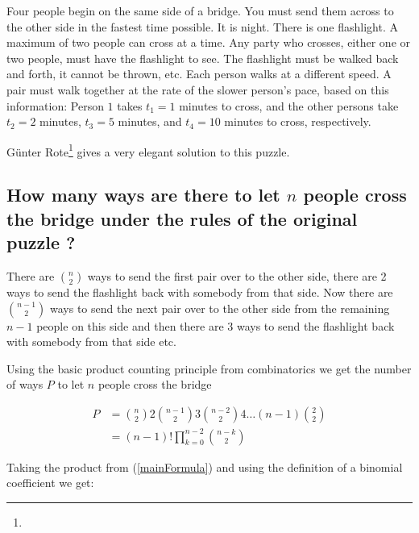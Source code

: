 \begin{fullwidth}

\vspace{10 mm}
\begin{problem}
Four people begin on the same side of a bridge. You must send them across to the other side in the fastest time possible. It is night. There is one flashlight. A maximum of two people can cross at a time. Any party who crosses, either one or two people, must have the flashlight to see. The flashlight must be walked back and forth, it cannot be thrown, etc. Each person walks at a different speed. A pair must walk together at the rate of the slower person's pace, based on this information: Person $1$ takes $t_1 = 1$ minutes to cross, and the other persons take $t_2 = 2$ minutes, $t_3 = 5$ minutes, and $t_4 = 10$ minutes to cross, respectively. 
\end{problem}

\end{fullwidth}

G\"unter Rote\footnote{} gives a very elegant solution to this puzzle.

\subsection{How many ways are there to let $n$ people cross the bridge under the rules of the original puzzle ?}

There are $\binom{n}{2}$ ways to send the first pair over to the other side, there are 2 ways to send the flashlight back with somebody from that side.  Now there are $\binom{n -1}{2}$ ways to send the next pair over to the other side from the remaining $n - 1$ people on this side and then there are 3 ways to send the flashlight back with somebody from that side etc.
 
Using the basic product counting principle from combinatorics we get the number of ways $P$ to let $n$ people cross the bridge

\begin{equation}
\begin{aligned}
P & = \binom{n}{2} 2 \binom{n - 1}{2} 3 \binom{n - 2}{2} 4 \dots (n - 1) \binom{2}{2} \\
    & = (n - 1) ! \prod_{k = 0}^{n - 2} \binom{n - k}{2}
\end{aligned}
\label{mainFormula}
\end{equation}

Taking the product from (\ref{mainFormula}) and using the definition of a binomial coefficient we get:

